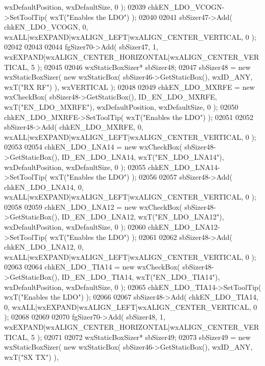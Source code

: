 \begin{DoxyCode}
      wxDefaultPosition, wxDefaultSize, 0 );
02039     chkEN_LDO_VCOGN->SetToolTip( wxT(\textcolor{stringliteral}{"Enables the LDO"}) );
02040     
02041     sbSizer47->Add( chkEN_LDO_VCOGN, 0, wxALL|wxEXPAND|wxALIGN\_LEFT|wxALIGN\_CENTER\_VERTICAL, 0 );
02042     
02043     
02044     fgSizer70->Add( sbSizer47, 1, wxEXPAND|wxALIGN\_CENTER\_HORIZONTAL|wxALIGN\_CENTER\_VERTICAL, 5 );
02045     
02046     wxStaticBoxSizer* sbSizer48;
02047     sbSizer48 = \textcolor{keyword}{new} wxStaticBoxSizer( \textcolor{keyword}{new} wxStaticBox( sbSizer46->GetStaticBox(), wxID\_ANY, wxT(\textcolor{stringliteral}{"RX RF"}) ),
       wxVERTICAL );
02048     
02049     chkEN_LDO_MXRFE = \textcolor{keyword}{new} wxCheckBox( sbSizer48->GetStaticBox(), ID_EN_LDO_MXRFE, wxT(\textcolor{stringliteral}{"EN\_LDO\_MXRFE"}), 
      wxDefaultPosition, wxDefaultSize, 0 );
02050     chkEN_LDO_MXRFE->SetToolTip( wxT(\textcolor{stringliteral}{"Enables the LDO"}) );
02051     
02052     sbSizer48->Add( chkEN_LDO_MXRFE, 0, wxALL|wxEXPAND|wxALIGN\_LEFT|wxALIGN\_CENTER\_VERTICAL, 0 );
02053     
02054     chkEN_LDO_LNA14 = \textcolor{keyword}{new} wxCheckBox( sbSizer48->GetStaticBox(), ID_EN_LDO_LNA14, wxT(\textcolor{stringliteral}{"EN\_LDO\_LNA14"}), 
      wxDefaultPosition, wxDefaultSize, 0 );
02055     chkEN_LDO_LNA14->SetToolTip( wxT(\textcolor{stringliteral}{"Enables the LDO"}) );
02056     
02057     sbSizer48->Add( chkEN_LDO_LNA14, 0, wxALL|wxEXPAND|wxALIGN\_LEFT|wxALIGN\_CENTER\_VERTICAL, 0 );
02058     
02059     chkEN_LDO_LNA12 = \textcolor{keyword}{new} wxCheckBox( sbSizer48->GetStaticBox(), ID_EN_LDO_LNA12, wxT(\textcolor{stringliteral}{"EN\_LDO\_LNA12"}), 
      wxDefaultPosition, wxDefaultSize, 0 );
02060     chkEN_LDO_LNA12->SetToolTip( wxT(\textcolor{stringliteral}{"Enables the LDO"}) );
02061     
02062     sbSizer48->Add( chkEN_LDO_LNA12, 0, wxALL|wxEXPAND|wxALIGN\_LEFT|wxALIGN\_CENTER\_VERTICAL, 0 );
02063     
02064     chkEN_LDO_TIA14 = \textcolor{keyword}{new} wxCheckBox( sbSizer48->GetStaticBox(), ID_EN_LDO_TIA14, wxT(\textcolor{stringliteral}{"EN\_LDO\_TIA14"}), 
      wxDefaultPosition, wxDefaultSize, 0 );
02065     chkEN_LDO_TIA14->SetToolTip( wxT(\textcolor{stringliteral}{"Enables the LDO"}) );
02066     
02067     sbSizer48->Add( chkEN_LDO_TIA14, 0, wxALL|wxEXPAND|wxALIGN\_LEFT|wxALIGN\_CENTER\_VERTICAL, 0 );
02068     
02069     
02070     fgSizer70->Add( sbSizer48, 1, wxEXPAND|wxALIGN\_CENTER\_HORIZONTAL|wxALIGN\_CENTER\_VERTICAL, 5 );
02071     
02072     wxStaticBoxSizer* sbSizer49;
02073     sbSizer49 = \textcolor{keyword}{new} wxStaticBoxSizer( \textcolor{keyword}{new} wxStaticBox( sbSizer46->GetStaticBox(), wxID\_ANY, wxT(\textcolor{stringliteral}{"SX TX"}) ),

\end{DoxyCode}
